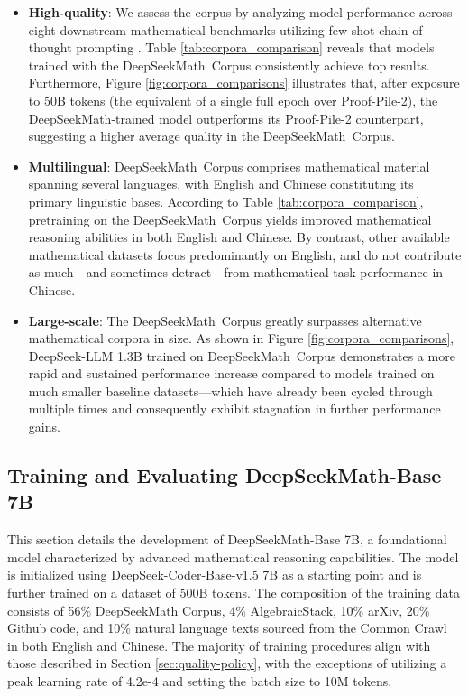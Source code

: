 \begin{itemize}[topsep=0pt]
\begin{itemize}[topsep=0pt]
    \item \textbf{High-quality}:
    We assess the corpus by analyzing model performance across eight downstream mathematical benchmarks utilizing few-shot chain-of-thought prompting \cite{cot}. Table \ref{tab:corpora_comparison} reveals that models trained with the DeepSeekMath~Corpus consistently achieve top results. Furthermore, Figure \ref{fig:corpora_comparisons} illustrates that, after exposure to 50B tokens (the equivalent of a single full epoch over Proof-Pile-2), the DeepSeekMath-trained model outperforms its Proof-Pile-2 counterpart, suggesting a higher average quality in the DeepSeekMath~Corpus.
    \item \textbf{Multilingual}:
    DeepSeekMath~Corpus comprises mathematical material spanning several languages, with English and Chinese constituting its primary linguistic bases. According to Table \ref{tab:corpora_comparison}, pretraining on the DeepSeekMath~Corpus yields improved mathematical reasoning abilities in both English and Chinese. By contrast, other available mathematical datasets focus predominantly on English, and do not contribute as much—and sometimes detract—from mathematical task performance in Chinese.
    \item \textbf{Large-scale}:
    The DeepSeekMath~Corpus greatly surpasses alternative mathematical corpora in size. As shown in Figure \ref{fig:corpora_comparisons}, DeepSeek-LLM 1.3B trained on DeepSeekMath~Corpus demonstrates a more rapid and sustained performance increase compared to models trained on much smaller baseline datasets—which have already been cycled through multiple times and consequently exhibit stagnation in further performance gains.
\end{itemize}

\subsection{Training and Evaluating DeepSeekMath-Base 7B}

This section details the development of DeepSeekMath-Base 7B, a foundational model characterized by advanced mathematical reasoning capabilities. The model is initialized using DeepSeek-Coder-Base-v1.5 7B \citep{deepseek-coder} as a starting point and is further trained on a dataset of 500B tokens. The composition of the training data consists of 56\% DeepSeekMath Corpus, 4\% AlgebraicStack, 10\% arXiv, 20\% Github code, and 10\% natural language texts sourced from the Common Crawl in both English and Chinese. The majority of training procedures align with those described in Section \ref{sec:quality-policy}, with the exceptions of utilizing a peak learning rate of 4.2e-4 and setting the batch size to 10M tokens.


\end{itemize}
